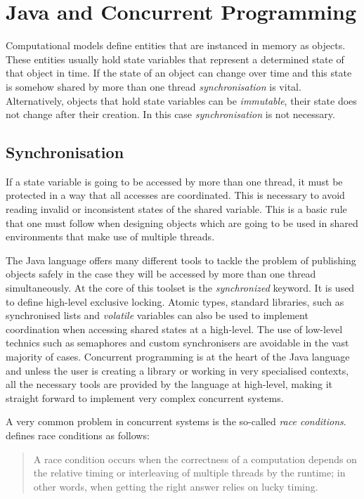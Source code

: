 \section{Java and Concurrent Programming}

Computational models define entities that are instanced in memory as objects. These entities usually hold state variables that represent a determined state of that object in time. If the state of an object can change over time and this state is somehow shared by more than one thread \emph{synchronisation} is vital. Alternatively, objects that hold state variables can be \emph{immutable}, their state does not change after their creation. In this case \emph{synchronisation} is not necessary.

\subsection{Synchronisation}

If a state variable is going to be accessed by more than one thread, it must be protected in a way that all accesses are coordinated. This is necessary to avoid reading invalid or inconsistent states of the shared variable. This is a basic rule that one must follow when designing objects which are going to be used in shared environments that make use of multiple threads.

The Java language offers many different tools to tackle the problem of publishing objects safely in the case they will be accessed by more than one thread simultaneously. At the core of this toolset is the \emph{synchronized} keyword. It is used to define high-level exclusive locking. Atomic types, standard libraries, such as synchronised lists and \emph{volatile} variables can also be used to implement coordination when accessing shared states at a high-level. The use of low-level technics such as semaphores and custom synchronisers are avoidable in the vast majority of cases. Concurrent programming is at the heart of the Java language and unless the user is creating a library or working in very specialised contexts, all the necessary tools are provided by the language at high-level, making it straight forward to implement very complex concurrent systems.

A very common problem in concurrent systems is the so-called \emph{race conditions}. \citeauthor{goetz2006java} \cite{goetz2006java} defines race conditions as follows:

\begin{quote}
   A race condition occurs when the correctness of a computation depends on the relative timing or interleaving of multiple threads by the runtime; in other words, when getting the right answer relies on lucky timing.
\end{quote}

